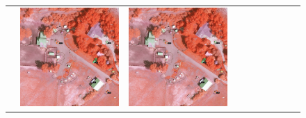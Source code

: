 \begin{figure}[H]
\begin{tabularx}{\textwidth}{c|*{9}{X}}
    & \includegraphics[trim={730pt 220pt 200pt 720pt},clip,width=\linewidth]{images/015Results/02perm_exp/comp_images/rgir/523.png}
    & \includegraphics[trim={850pt 110pt 80pt 830pt},clip,width=\linewidth]{images/015Results/02perm_exp/comp_images/rgir/523.png}

\end{tabularx}
\end{figure}
